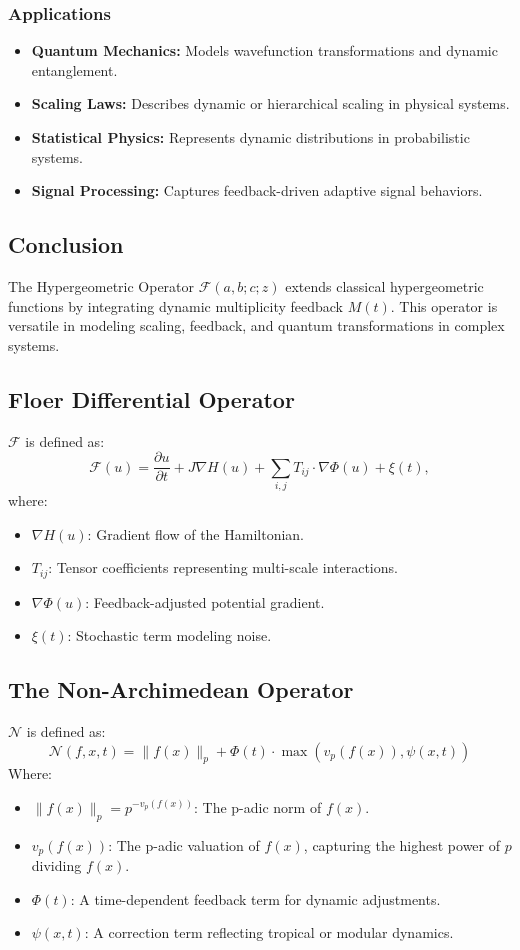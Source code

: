 \documentclass{article}
\theoremstyle{plain}
\begin{document}
\begin{itemize}
\subsubsection*{Applications}
\begin{itemize}
    \item \textbf{Quantum Mechanics:} Models wavefunction transformations and dynamic entanglement.
    \item \textbf{Scaling Laws:} Describes dynamic or hierarchical scaling in physical systems.
    \item \textbf{Statistical Physics:} Represents dynamic distributions in probabilistic systems.
    \item \textbf{Signal Processing:} Captures feedback-driven adaptive signal behaviors.
\end{itemize}

\subsection*{Conclusion}
The Hypergeometric Operator \( \mathcal{F}(a, b; c; z) \) extends classical hypergeometric functions by integrating dynamic multiplicity feedback \( M(t) \). This operator is versatile in modeling scaling, feedback, and quantum transformations in complex systems.

\subsection{Floer Differential Operator}
$\mathcal{F}$ is defined as:
\begin{equation}
    \mathcal{F}(u) = \frac{\partial u}{\partial t} + J \nabla H(u) + \sum_{i,j} T_{ij} \cdot \nabla \Phi(u) + \xi(t),
\end{equation}
where:
\begin{itemize}
    \item $\nabla H(u)$: Gradient flow of the Hamiltonian.
    \item $T_{ij}$: Tensor coefficients representing multi-scale interactions.
    \item $\nabla \Phi(u)$: Feedback-adjusted potential gradient.
    \item $\xi(t)$: Stochastic term modeling noise.
\end{itemize}
\subsection{The Non-Archimedean Operator} \( \mathcal{N} \) is defined as:
\[
\mathcal{N}(f, x, t) = \| f(x) \|_p + \Phi(t) \cdot \max\left( v_p(f(x)), \psi(x, t) \right)
\]
Where:
\begin{itemize}
    \item \( \| f(x) \|_p = p^{-v_p(f(x))} \): The p-adic norm of \( f(x) \).
    \item \( v_p(f(x)) \): The p-adic valuation of \( f(x) \), capturing the highest power of \( p \) dividing \( f(x) \).
    \item \( \Phi(t) \): A time-dependent feedback term for dynamic adjustments.
    \item \( \psi(x, t) \): A correction term reflecting tropical or modular dynamics.
\end{itemize}

\end{itemize}
\end{document}
